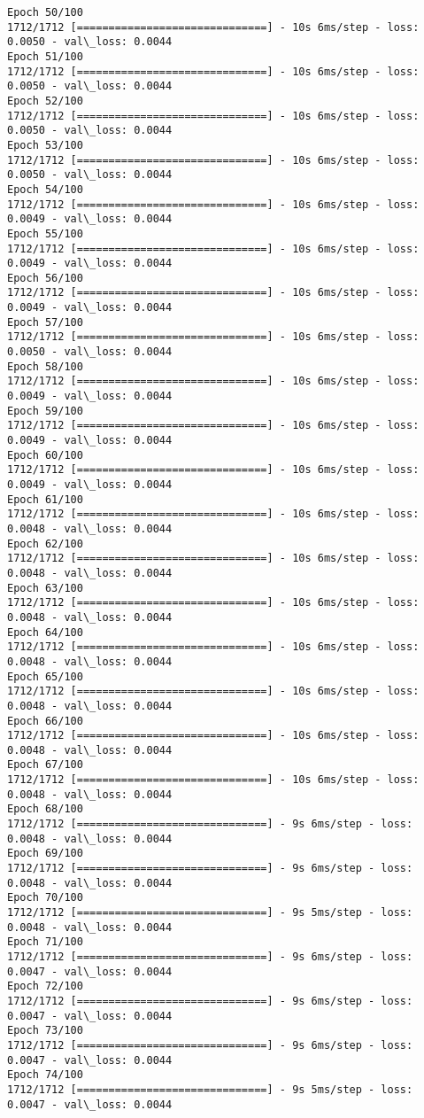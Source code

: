 \documentclass[11pt]{article}
\begin{document}
\begin{Verbatim}[commandchars=\\\{\}]
Epoch 50/100
1712/1712 [==============================] - 10s 6ms/step - loss: 0.0050 - val\_loss: 0.0044
Epoch 51/100
1712/1712 [==============================] - 10s 6ms/step - loss: 0.0050 - val\_loss: 0.0044
Epoch 52/100
1712/1712 [==============================] - 10s 6ms/step - loss: 0.0050 - val\_loss: 0.0044
Epoch 53/100
1712/1712 [==============================] - 10s 6ms/step - loss: 0.0050 - val\_loss: 0.0044
Epoch 54/100
1712/1712 [==============================] - 10s 6ms/step - loss: 0.0049 - val\_loss: 0.0044
Epoch 55/100
1712/1712 [==============================] - 10s 6ms/step - loss: 0.0049 - val\_loss: 0.0044
Epoch 56/100
1712/1712 [==============================] - 10s 6ms/step - loss: 0.0049 - val\_loss: 0.0044
Epoch 57/100
1712/1712 [==============================] - 10s 6ms/step - loss: 0.0050 - val\_loss: 0.0044
Epoch 58/100
1712/1712 [==============================] - 10s 6ms/step - loss: 0.0049 - val\_loss: 0.0044
Epoch 59/100
1712/1712 [==============================] - 10s 6ms/step - loss: 0.0049 - val\_loss: 0.0044
Epoch 60/100
1712/1712 [==============================] - 10s 6ms/step - loss: 0.0049 - val\_loss: 0.0044
Epoch 61/100
1712/1712 [==============================] - 10s 6ms/step - loss: 0.0048 - val\_loss: 0.0044
Epoch 62/100
1712/1712 [==============================] - 10s 6ms/step - loss: 0.0048 - val\_loss: 0.0044
Epoch 63/100
1712/1712 [==============================] - 10s 6ms/step - loss: 0.0048 - val\_loss: 0.0044
Epoch 64/100
1712/1712 [==============================] - 10s 6ms/step - loss: 0.0048 - val\_loss: 0.0044
Epoch 65/100
1712/1712 [==============================] - 10s 6ms/step - loss: 0.0048 - val\_loss: 0.0044
Epoch 66/100
1712/1712 [==============================] - 10s 6ms/step - loss: 0.0048 - val\_loss: 0.0044
Epoch 67/100
1712/1712 [==============================] - 10s 6ms/step - loss: 0.0048 - val\_loss: 0.0044
Epoch 68/100
1712/1712 [==============================] - 9s 6ms/step - loss: 0.0048 - val\_loss: 0.0044
Epoch 69/100
1712/1712 [==============================] - 9s 6ms/step - loss: 0.0048 - val\_loss: 0.0044
Epoch 70/100
1712/1712 [==============================] - 9s 5ms/step - loss: 0.0048 - val\_loss: 0.0044
Epoch 71/100
1712/1712 [==============================] - 9s 6ms/step - loss: 0.0047 - val\_loss: 0.0044
Epoch 72/100
1712/1712 [==============================] - 9s 6ms/step - loss: 0.0047 - val\_loss: 0.0044
Epoch 73/100
1712/1712 [==============================] - 9s 6ms/step - loss: 0.0047 - val\_loss: 0.0044
Epoch 74/100
1712/1712 [==============================] - 9s 5ms/step - loss: 0.0047 - val\_loss: 0.0044

\end{Verbatim}
\end{document}
